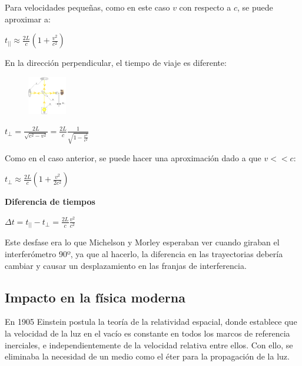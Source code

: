 \documentclass[a4paper]{article}
\begin{document}
		\indent Para velocidades pequeñas, como en este caso $v$ con respecto a $c$, se puede aproximar a:
		
		\begin{center}
			${t_{||}} \approx {\frac{2L}{c}} (1 + \frac{v^2}{c^2})$
		\end{center}
		
		\indent En la dirección perpendicular, el tiempo de viaje es diferente:
		\begin{figure}[h!]
			\centering
			\includegraphics[width=0.15\textwidth]{../imagenes/dibujoExperimentoMM.png}
			
			
		\end{figure}
		\begin{center}
			$t_{\perp} = \frac{2L}{\sqrt{c^2 - v^2}} = {\frac{2L}{c}} \frac{1}{\sqrt{1 - \frac{v^2}{c^2}}}$  
		\end{center}
		
		\indent Como en el caso anterior, se puede hacer una aproximación dado a que $v << c$:
		
		\begin{center}
			${t_{\perp}} \approx {\frac{2L}{c}} (1 + \frac{v^2}{2c^2})$
		\end{center}
		
		\textbf{Diferencia de tiempos}
		
		\begin{center}
			$\Delta t = {t_{||}} - {t_{\perp}} = {\frac{2L}{c}} {\frac{v^2}{c^2}}$
		\end{center}
		
		\indent Este desfase era lo que Michelson y Morley esperaban ver cuando giraban el interferómetro 90º, ya que al hacerlo, la diferencia en las trayectorias debería cambiar y causar un desplazamiento en las franjas de interferencia.
		
		\subsection{Impacto en la física moderna}
		\indent En 1905 Einstein postula la teoría de la relatividad espacial, donde establece que la velocidad de la luz en el vacío es constante en todos los marcos de referencia inerciales, e independientemente de la velocidad relativa entre ellos. \newline
		\indent Con ello, se eliminaba la necesidad de un medio como el éter para la propagación de la luz.
		
	
\end{document}
